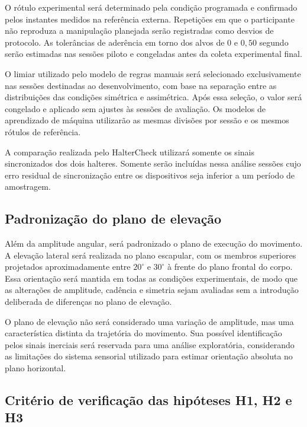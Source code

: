 O rótulo experimental será determinado pela condição programada e
confirmado pelos instantes medidos na referência externa. Repetições em
que o participante não reproduza a manipulação planejada serão
registradas como desvios de protocolo. As tolerâncias de aderência em
torno dos alvos de $0$ e $0{,}50$ segundo serão estimadas nas sessões
piloto e congeladas antes da coleta experimental final.

O limiar utilizado pelo modelo de regras manuais será selecionado
exclusivamente nas sessões destinadas ao desenvolvimento, com base na
separação entre as distribuições das condições simétrica e assimétrica.
Após essa seleção, o valor será congelado e aplicado sem ajustes às
sessões de avaliação. Os modelos de aprendizado de máquina utilizarão as
mesmas divisões por sessão e os mesmos rótulos de referência.

A comparação realizada pelo HalterCheck utilizará somente os sinais
sincronizados dos dois halteres. Somente serão incluídas nessa análise
sessões cujo erro residual de sincronização entre os dispositivos seja
inferior a um período de amostragem.

\subsection{Padronização do plano de elevação}
\label{subsec:plano-elevacao}

Além da amplitude angular, será padronizado o plano de execução do
movimento. A elevação lateral será realizada no plano escapular, com os
membros superiores projetados aproximadamente entre $20^\circ$ e
$30^\circ$ à frente do plano frontal do corpo. Essa orientação será
mantida em todas as condições experimentais, de modo que as alterações
de amplitude, cadência e simetria sejam avaliadas sem a introdução
deliberada de diferenças no plano de elevação.

O plano de elevação não será considerado uma variação de amplitude, mas
uma característica distinta da trajetória do movimento. Sua possível
identificação pelos sinais inerciais será reservada para uma análise
exploratória, considerando as limitações do sistema sensorial utilizado
para estimar orientação absoluta no plano horizontal.

\subsection{Critério de verificação das hipóteses H1, H2 e H3}
\label{subsec:criterio-h1-h3}

